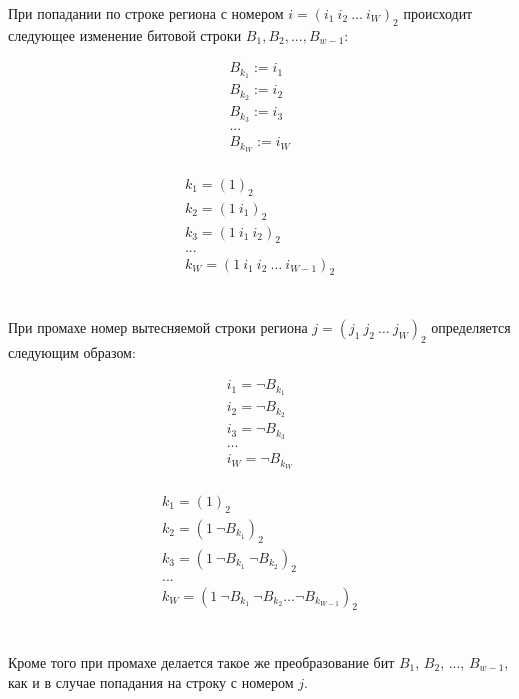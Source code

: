 \begin{utv}\label{wMinus1PseudoLRU}При попадании по строке региона с номером $i = (i_1~i_2~\dots~i_W)_2$ происходит следующее изменение битовой строки $B_1,
B_2, ..., B_{w{-}1}$:

\parbox{0.3\textwidth}{
  $$ \begin{array}{l}
  B_{k_1} := i_1 \\
  B_{k_2} := i_2 \\
  B_{k_3} := i_3 \\
  ...\\
  B_{k_W} := i_W \\
  \end{array}$$
} \vline
\parbox{0.7\textwidth}{
  $$ \begin{array}{l}
  k_1 = (1)_2 \\
  k_2 = (1~i_1)_2 \\
  k_3 = (1~i_1~i_2)_2 \\
  ...\\
  k_W = (1~i_1~i_2~\dots~i_{W{-}1})_2 \\
  \end{array} $$
}
\\[1cm]

При промахе номер вытесняемой строки региона $j = (j_1~j_2~\dots~j_W)_2$ определяется следующим образом:

\parbox{0.3\textwidth}{
  $$ \begin{array}{l}
  i_1 = \neg B_{k_1} \\
  i_2 = \neg B_{k_2} \\
  i_3 = \neg B_{k_3} \\
  ...\\
  i_W = \neg B_{k_W} \\
  \end{array}$$
} \vline
\parbox{0.7\textwidth}{
  $$ \begin{array}{l}
  k_1 = (1)_2 \\
  k_2 = (1~\neg B_{k_1})_2 \\
  k_3 = (1~\neg B_{k_1}~\neg B_{k_2})_2 \\
  ...\\
  k_W = (1~\neg B_{k_1}~\neg B_{k_2}\dots\neg B_{k_{W{-}1}})_2 \\
  \end{array} $$
}
\\[0.5cm]

Кроме того при промахе делается такое же преобразование бит $B_1$, $B_2$, ..., $B_{w{-}1}$, как и в случае попадания на строку с номером $j$.
\end{utv}

